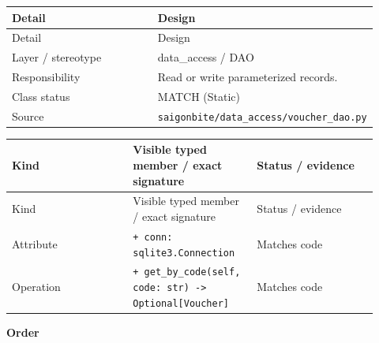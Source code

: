 \begin{longtable}{>{\raggedright\arraybackslash}p{0.4600\linewidth}>{\raggedright\arraybackslash}p{0.4600\linewidth}}
Detail & Design \\
\hline\endfirsthead
Detail & Design \\
\hline\endhead
Layer / stereotype & data\_access / \guillemotleft{}DAO\guillemotright{} \\
Responsibility & Read or write parameterized records. \\
Class status & MATCH (Static) \\
Source & \texttt{saigonbite/\allowbreak{}data\_\allowbreak{}access/\allowbreak{}voucher\_\allowbreak{}dao.\allowbreak{}py} \\
\end{longtable}
\begin{longtable}{>{\raggedright\arraybackslash}p{0.3067\linewidth}>{\raggedright\arraybackslash}p{0.3067\linewidth}>{\raggedright\arraybackslash}p{0.3067\linewidth}}
Kind & Visible typed member / exact signature & Status / evidence \\
\hline\endfirsthead
Kind & Visible typed member / exact signature & Status / evidence \\
\hline\endhead
Attribute & \texttt{+ conn: sqlite3.\allowbreak{}Connection} & Matches code \\
Operation & \texttt{+ get\_\allowbreak{}by\_\allowbreak{}code(self, code: str) -\textgreater{} Optional[Voucher]} & Matches code \\
\end{longtable}
\textbf{Order}

